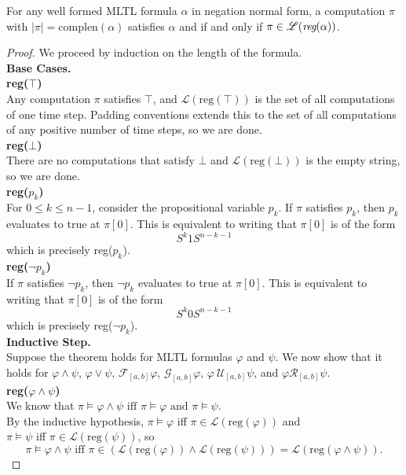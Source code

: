 \documentclass[runningheads]{llncs}
\begin{document}
 \begin{theorem}
 For any well formed MLTL formula $\alpha$ in negation normal form, a computation $\pi$ with $|\pi| = \text{complen}(\alpha)$ satisfies $\alpha$ and  if and only if $\pi \in \mathscr{L}(\emph{reg}(\alpha))$.
 \end{theorem}
 \begin{proof}
 We proceed by induction on the length of the formula.\\
 
 \noindent \textbf{Base Cases.}\\
 \noindent\textbf{reg($\top$)}\\
 Any computation $\pi$ satisfies $\top$, and $\mathscr{L}(\text{reg}(\top))$ is the set of all computations of one time step. Padding conventions extends this to the set of all computations of any positive number of time steps, so we are done.\\
 
 \noindent\textbf{reg($\bot$)}\\
 There are no computations that satisfy $\bot$ and $\mathscr{L}(\text{reg}(\bot))$ is the empty string, so we are done.\\
 
 \noindent\textbf{reg($p_k$)}\\
 For $0\leq k \leq n-1$, consider the propositional variable $p_k$. If $\pi$ satisfies $p_k$, then $p_k$ evaluates to true at $\pi[0]$. This is equivalent to writing that $\pi[0]$ is of the form 
 $$S^{k} 1 S^{n-k-1}$$
 which is precisely reg($p_k$).\\
 
 \noindent\textbf{reg($\neg p_k$)}\\
 If $\pi$ satisfies $\neg p_k$, then $\neg p_k$ evaluates to true at $\pi[0]$. This is equivalent to writing that $\pi[0]$ is of the form 
 $$S^{k} 0 S^{n-k-1}$$
 which is precisely reg($\neg p_k$).\\
 
 \noindent\textbf{Inductive Step.}\\
 Suppose the theorem holds for MLTL formulas $\varphi$ and $\psi$. We now show that it holds for $\varphi \land \psi$, $\varphi \lor \psi$, $\mathcal{F}_{[a,b]} \varphi$, $\mathcal{G}_{[a,b]} \varphi$, $\varphi \ \mathcal{U}_{[a,b]} \psi$, and $\varphi \mathcal{R}_{[a,b]} \psi$.\\
 
 \noindent \textbf{reg($\varphi \land \psi$)}\\
 We know that $\pi \vDash \varphi \land \psi \text{ iff } \pi \vDash \varphi \text{ and } \pi \vDash \psi$.\\
 By the inductive hypothesis, $\pi \vDash \varphi$ iff $\pi \in \mathscr{L}(\text{reg}(\varphi))$ and 
 \\$\pi \vDash \psi$ iff $\pi \in \mathscr{L}(\text{reg}(\psi))$, so
 $$\pi \vDash \varphi \land \psi \text{ iff } \pi \in (\mathscr{L}(\text{reg}(\varphi)) \land \mathscr{L}(\text{reg}(\psi))) = \mathscr{L}(\text{reg}(\varphi \land \psi)).$$
 

\end{proof}
\end{document}
